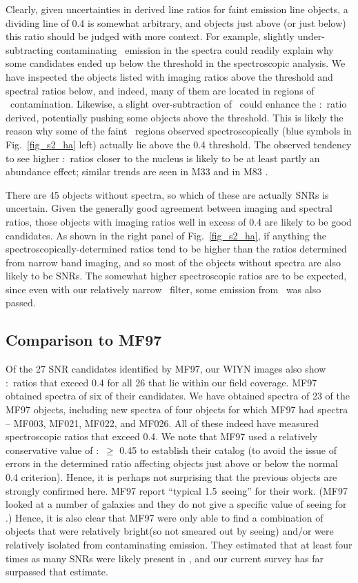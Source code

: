 Clearly, given uncertainties in derived line ratios for faint emission line objects, a dividing line of 0.4 is somewhat arbitrary, and objects just above (or just below) this ratio should be judged with more context.  For example, slightly under-subtracting contaminating \ha\ emission in the spectra could readily explain why some candidates ended up below the threshold in the spectroscopic analysis. We have inspected the objects listed with imaging ratios above the threshold and spectral ratios below, and indeed, many of them are located in regions of \hii\ contamination. Likewise, a slight over-subtraction of \ha\ could enhance the \sii:\ha\ ratio derived, potentially pushing some objects above the threshold.  This is likely the reason why some of the faint \hii\ regions observed spectroscopically (blue symbols in Fig.\ \ref{fig_s2_ha} left) actually lie above the 0.4 threshold.  The observed tendency to see higher \sii:\ha\ ratios closer to the nucleus is likely to be at least partly an abundance effect; similar trends are seen in M33 \citep{long18} and in M83 \citep{winkler17}. 

There are 45 objects without spectra, so which of these are actually SNRs is uncertain. Given the generally good agreement between imaging and spectral ratios, those objects with imaging ratios well in excess of 0.4 are likely to be good candidates. As shown in the right panel of Fig.\ \ref{fig_s2_ha}, if anything the spectroscopically-determined ratios tend to be higher than the ratios determined from narrow band imaging, and so most of the objects without spectra are also likely to be SNRs.  The somewhat higher spectroscopic ratios are to be expected, since even with our relatively narrow \ha\ filter, some emission from \nii\ was  also passed.   

\subsection{Comparison to MF97}

Of the 27 SNR candidates identified by MF97, our WIYN images also show \sii:\ha\ ratios that exceed 0.4 for all 26 that lie within our field coverage.  MF97 obtained spectra of six of their candidates.  We have obtained spectra of 23 of the MF97 objects, including new spectra of four objects for which MF97 had spectra -- MF003, MF021, MF022, and MF026.  All of these indeed have measured spectroscopic ratios that exceed 0.4.  We note that MF97 used a relatively conservative value of \sii:\ha\ $\ge$ 0.45 to establish their catalog (to avoid the issue of errors in the determined ratio affecting objects just above or below the normal 0.4 criterion).  Hence, it is perhaps not surprising that the previous objects are strongly confirmed here.  MF97 report ``typical 1.5\arcsec\ seeing'' for their work. (MF97 looked at a number of galaxies and they do not give a specific value of seeing for \gal.) Hence, it is also clear that MF97 were only able to find a combination of objects that were relatively bright(so not smeared out by seeing) and/or were relatively isolated from contaminating emission.  They estimated that at least four times as many SNRs were likely present in \gal, and our current survey has far surpassed that estimate.

